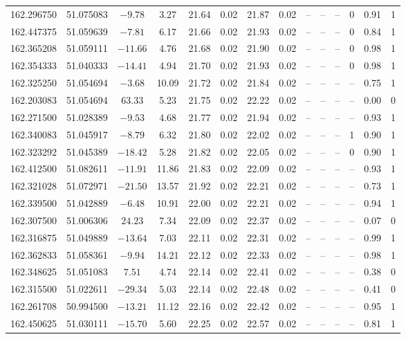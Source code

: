 \begin{tabular}{ccccccccccccc}
162.296750 & 51.075083 & $-9.78$ & 3.27 & 21.64 & 0.02 & 21.87 & 0.02 & -- & -- & -- & 0 & 0.91 & 1 \\
162.447375 & 51.059639 & $-7.81$ & 6.17 & 21.66 & 0.02 & 21.93 & 0.02 & -- & -- & -- & 0 & 0.84 & 1 \\
162.365208 & 51.059111 & $-11.66$ & 4.76 & 21.68 & 0.02 & 21.90 & 0.02 & -- & -- & -- & 0 & 0.98 & 1 \\
162.354333 & 51.040333 & $-14.41$ & 4.94 & 21.70 & 0.02 & 21.93 & 0.02 & -- & -- & -- & 0 & 0.98 & 1 \\
162.325250 & 51.054694 & $-3.68$ & 10.09 & 21.72 & 0.02 & 21.84 & 0.02 & -- & -- & -- & -- & 0.75 & 1 \\
162.203083 & 51.054694 & $63.33$ & 5.23 & 21.75 & 0.02 & 22.22 & 0.02 & -- & -- & -- & -- & 0.00 & 0 \\
162.271500 & 51.028389 & $-9.53$ & 4.68 & 21.77 & 0.02 & 21.94 & 0.02 & -- & -- & -- & -- & 0.93 & 1 \\
162.340083 & 51.045917 & $-8.79$ & 6.32 & 21.80 & 0.02 & 22.02 & 0.02 & -- & -- & -- & 1 & 0.90 & 1 \\
162.323292 & 51.045389 & $-18.42$ & 5.28 & 21.82 & 0.02 & 22.05 & 0.02 & -- & -- & -- & 0 & 0.90 & 1 \\
162.412500 & 51.082611 & $-11.91$ & 11.86 & 21.83 & 0.02 & 22.09 & 0.02 & -- & -- & -- & -- & 0.93 & 1 \\
162.321028 & 51.072971 & $-21.50$ & 13.57 & 21.92 & 0.02 & 22.21 & 0.02 & -- & -- & -- & -- & 0.73 & 1 \\
162.339500 & 51.042889 & $-6.48$ & 10.91 & 22.00 & 0.02 & 22.21 & 0.02 & -- & -- & -- & -- & 0.94 & 1 \\
162.307500 & 51.006306 & $24.23$ & 7.34 & 22.09 & 0.02 & 22.37 & 0.02 & -- & -- & -- & -- & 0.07 & 0 \\
162.316875 & 51.049889 & $-13.64$ & 7.03 & 22.11 & 0.02 & 22.31 & 0.02 & -- & -- & -- & -- & 0.99 & 1 \\
162.362833 & 51.058361 & $-9.94$ & 14.21 & 22.12 & 0.02 & 22.33 & 0.02 & -- & -- & -- & -- & 0.98 & 1 \\
162.348625 & 51.051083 & $7.51$ & 4.74 & 22.14 & 0.02 & 22.41 & 0.02 & -- & -- & -- & -- & 0.38 & 0 \\
162.315500 & 51.022611 & $-29.34$ & 5.03 & 22.14 & 0.02 & 22.48 & 0.02 & -- & -- & -- & -- & 0.41 & 0 \\
162.261708 & 50.994500 & $-13.21$ & 11.12 & 22.16 & 0.02 & 22.42 & 0.02 & -- & -- & -- & -- & 0.95 & 1 \\
162.450625 & 51.030111 & $-15.70$ & 5.60 & 22.25 & 0.02 & 22.57 & 0.02 & -- & -- & -- & -- & 0.81 & 1 \\

\end{tabular}
